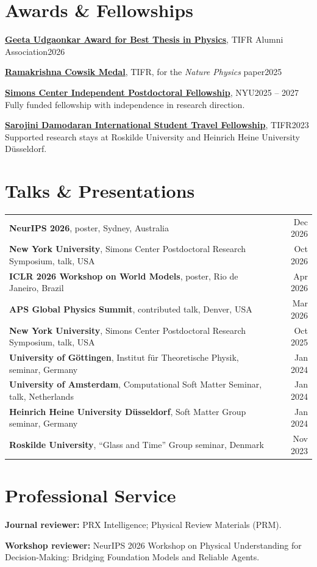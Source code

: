\documentclass[11pt,letterpaper]{article}
\begin{document}
\section{Awards \& Fellowships}
\textbf{\href{https://www.tifr.res.in/~academics/best_thesis.php}{Geeta Udgaonkar Award for Best Thesis in Physics}}, TIFR Alumni Association\hfill 2026\par\vspace{4pt}
\textbf{\href{https://www.tifr.res.in/~endowment/endowment-awards.htm}{Ramakrishna Cowsik Medal}}, TIFR, for the \textit{Nature Physics} paper\hfill 2025\par\vspace{4pt}
\textbf{\href{https://wp.nyu.edu/sccpc/people/}{Simons Center Independent Postdoctoral Fellowship}}, NYU\hfill 2025 -- 2027\\
Fully funded fellowship with independence in research direction.\par\vspace{4pt}
\textbf{\href{https://www.tifr.res.in/endowment/sdf/index.html}{Sarojini Damodaran International Student Travel Fellowship}}, TIFR\hfill 2023\\
Supported research stays at Roskilde University and Heinrich Heine University D\"usseldorf.

\section{Talks \& Presentations}
\begin{tabularx}{\linewidth}{@{}X@{\quad}r@{}}
\textbf{NeurIPS 2026}, poster, Sydney, Australia & Dec 2026\\[1pt]
\textbf{New York University}, Simons Center Postdoctoral Research Symposium, talk, USA & Oct 2026\\[1pt]
\textbf{ICLR 2026 Workshop on World Models}, poster, Rio de Janeiro, Brazil & Apr 2026\\[1pt]
\textbf{APS Global Physics Summit}, contributed talk, Denver, USA & Mar 2026\\[1pt]
\textbf{New York University}, Simons Center Postdoctoral Research Symposium, talk, USA & Oct 2025\\[1pt]
\textbf{University of G\"ottingen}, Institut f\"ur Theoretische Physik, seminar, Germany & Jan 2024\\[1pt]
\textbf{University of Amsterdam}, Computational Soft Matter Seminar, talk, Netherlands & Jan 2024\\[1pt]
\textbf{Heinrich Heine University D\"usseldorf}, Soft Matter Group seminar, Germany & Jan 2024\\[1pt]
\textbf{Roskilde University}, ``Glass and Time'' Group seminar, Denmark & Nov 2023
\end{tabularx}

\section{Professional Service}
\textbf{Journal reviewer:} PRX Intelligence; Physical Review Materials (PRM).\par\vspace{4pt}
\textbf{Workshop reviewer:} NeurIPS 2026 Workshop on Physical Understanding for Decision-Making:
Bridging Foundation Models and Reliable Agents.
\end{document}
